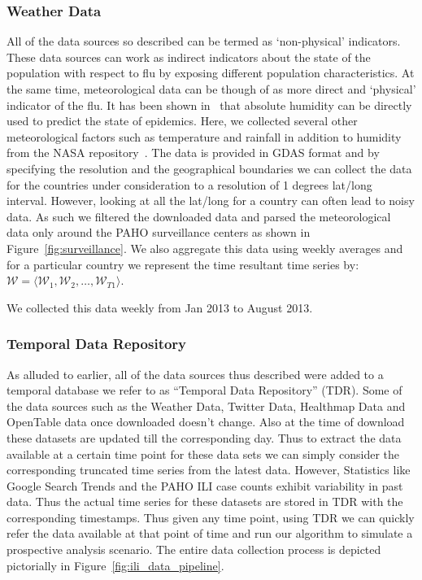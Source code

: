 \subsubsection{Weather Data} 
All of the data sources so described can be termed as `non-physical'
indicators. These data sources can work as indirect indicators about the
state of the population with respect to flu by exposing different
population characteristics. At the same time, meteorological data can be
though of as more direct and `physical' indicator of the flu. It has
been shown in~\cite{ref9} that absolute humidity can be directly used to
predict the state of epidemics. Here, we collected several other
meteorological factors such as temperature and rainfall in addition to
humidity from the NASA repository~\cite{HD:2013}. The data is provided
in GDAS format and by specifying the resolution and the geographical
boundaries we can collect the data for the countries under consideration
to a resolution of 1 degrees lat/long interval. However, looking at all
the lat/long for a country can often lead to noisy data. As such we
filtered the downloaded data and parsed the meteorological data only around
the PAHO surveillance centers as shown in
Figure~\ref{fig:surveillance}. We also aggregate this data using weekly
averages and for a particular country we represent the time resultant
time series by:
$\mathcal{W} = \langle \mathcal{W}_1, \mathcal{W}_2, \dots, \mathcal{W}_{T1} \rangle$.

We collected this data weekly from Jan 2013 to August 2013. 


\subsubsection{Temporal Data Repository}
As alluded to earlier, all of the data sources thus described were added to a temporal database
we refer to as ``Temporal Data Repository'' (TDR). Some of the data
sources such as the Weather Data, Twitter Data, Healthmap Data and
OpenTable data once downloaded doesn't change. Also at the time of
download these datasets are updated till the corresponding day. 
Thus to extract the data available at a certain time point for these
data sets we can simply consider the corresponding truncated time series
from the latest data. However, Statistics like Google Search Trends and
the PAHO ILI case counts exhibit variability in past data. Thus the
actual time series for these datasets are stored in TDR with the
corresponding timestamps. Thus given any time point, using TDR we can
quickly refer the data available at that point of time and run our
algorithm to simulate a prospective analysis scenario. 
The entire data collection process is depicted
pictorially in Figure~\ref{fig:ili_data_pipeline}.
